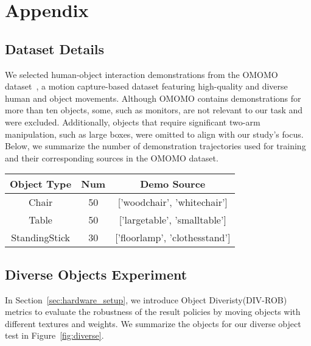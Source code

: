 \newpage
\section{Appendix}
\subsection{Dataset Details}
We selected human-object interaction demonstrations from the OMOMO dataset~\citep{OMOMO}, a motion capture-based dataset featuring high-quality and diverse human and object movements. Although OMOMO contains demonstrations for more than ten objects, some, such as monitors, are not relevant to our task and were excluded. Additionally, objects that require significant two-arm manipulation, such as large boxes, were omitted to align with our study's focus. Below, we summarize the number of demonstration trajectories used for training and their corresponding sources in the OMOMO dataset.

\vspace{0.2cm}

\begin{tabular}{c | c | c }
\toprule
\rowcolor[HTML]{ededed}
Object Type& Num  &  Demo Source\\
\midrule
Chair & 50 &  ['woodchair', 'whitechair'] \\
\midrule
Table &  50 &  ['largetable', 'smalltable']  \\
\midrule
StandingStick & 30 &  ['floorlamp', 'clothesstand']\\
\bottomrule
\end{tabular}


\vspace{0.2cm}

\subsection{Diverse Objects Experiment}

In Section~\ref{sec:hardware_setup}, we introduce Object Diveristy(DIV-ROB) metrics to evaluate the robustness of the result policies by moving objects with different textures and weights. We summarize the objects for our diverse object test in Figure~\ref{fig:diverse}. 

